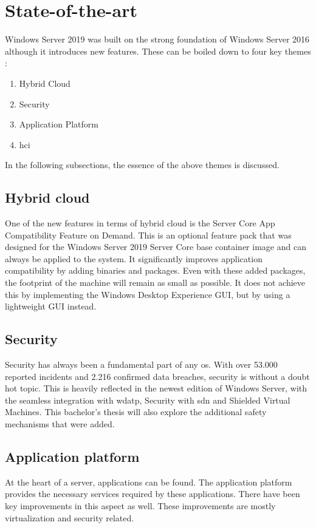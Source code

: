 \section{State-of-the-art}\label{sec:state-of-the-art}
Windows Server 2019 was built on the strong foundation of Windows Server 2016 although it introduces new features. \autocite{Gerend2018}
These can be boiled down to four key themes \autocite{MWST2018}:
\begin{enumerate}
	\item Hybrid Cloud
	\item Security
	\item Application Platform
	\item  \acrfull{hci}
\end{enumerate}
In the following subsections, the essence of the above themes is discussed.
\subsection{Hybrid cloud}
One of the new features in terms of hybrid cloud is the Server Core App Compatibility Feature on Demand. \autocite{Pacquer2018}
This is an optional feature pack that was designed for the Windows Server 2019 Server Core base container image and can always be applied to the system. 
It significantly improves application compatibility by adding binaries and packages. 
Even with these added packages, the footprint of the machine will remain as small as possible. 
It does not achieve this by implementing the Windows Desktop Experience GUI, but by using a lightweight GUI instead.
\subsection{Security}
Security has always been a fundamental part of any \acrshort{os}. 
With over 53.000 reported incidents and 2.216 confirmed data breaches, security is without a doubt hot topic. \autocite{Verizon2018} 
This is heavily reflected in the newest edition of Windows Server, with the seamless integration with \acrfull{wdatp}, Security with \acrfull{sdn} and Shielded Virtual Machines. 
This bachelor's thesis will also explore the additional safety mechanisms that were added.
\subsection{Application platform}
At the heart of a server, applications can be found. 
The application platform provides the necessary services required by these applications.
There have been key improvements in this aspect as well. 
These improvements are mostly virtualization and security related. 
